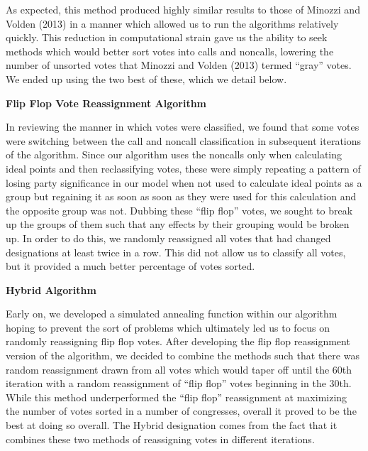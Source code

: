 \documentclass[12pt]{article}
\begin{document}
As expected, this method produced highly similar results to those of Minozzi and Volden (2013) in a manner which allowed us to run the algorithms relatively quickly. This reduction in computational strain gave us the ability to seek methods which would better sort votes into calls and noncalls, lowering the number of unsorted votes that Minozzi and Volden (2013) termed ``gray'' votes. We ended up using the two best of these, which we detail below.

\noindent
\textbf{Flip Flop Vote Reassignment Algorithm}

In reviewing the manner in which votes were classified, we found that some votes were switching between the call and noncall classification in subsequent iterations of the algorithm. Since our algorithm uses the noncalls only when calculating ideal points and then reclassifying votes, these were simply repeating a pattern of losing party significance in our model when not used to calculate ideal points as a group but regaining it as soon as soon as they were used for this calculation and the opposite group was not. Dubbing these ``flip flop'' votes, we sought to break up the groups of them such that any effects by their grouping would be broken up. In order to do this, we randomly reassigned all votes that had changed designations at least twice in a row. This did not allow us to classify all votes, but it provided a much better percentage of votes sorted.

\noindent
\textbf{Hybrid Algorithm}

Early on, we developed a simulated annealing function within our algorithm hoping to prevent the sort of problems which ultimately led us to focus on randomly reassigning flip flop votes. After developing the flip flop reassignment version of the algorithm, we decided to combine the methods such that there was random reassignment drawn from all votes which would taper off until the 60th iteration with a random reassignment of ``flip flop'' votes beginning in the 30th. While this method underperformed the ``flip flop'' reassignment at maximizing the number of votes sorted in a number of congresses, overall it proved to be the best at doing so overall. The Hybrid designation comes from the fact that it combines these two methods of reassigning votes in different iterations.
\end{document}
